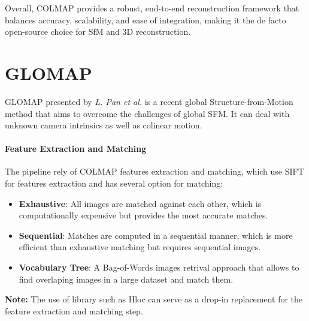 
Overall, COLMAP provides a robust, end-to-end reconstruction framework that balances accuracy, scalability, and ease of integration, making it the de facto open-source choice for SfM and 3D reconstruction.

\section{GLOMAP}\label{sec:glomap}
GLOMAP \cite{pan2024glomap} presented by \textit{L. Pan et al.} is a recent global Structure-from-Motion method that aims to overcome the challenges of global SFM. It can deal with unknown camera intrinsics as well as colinear motion.

\paragraph{Feature Extraction and Matching}
The pipeline rely of COLMAP features extraction and matching, which use SIFT \cite{Lowe2004DistinctiveIF} for features extraction and has several option for matching: 
\begin{itemize}
    \item \textbf{Exhaustive}: All images are matched against each other, which is computationally expensive but provides the most accurate matches.
    \item \textbf{Sequential}: Matches are computed in a sequential manner, which is more efficient than exhaustive matching but requires sequential images.
    \item \textbf{Vocabulary Tree}: A Bag-of-Words images retrival approach \cite{schoenberger2016vote} that allows to find overlaping images in a large dataset and match them.
\end{itemize}
\textbf{Note:} The use of library such as Hloc \cite{sarlin2019coarse} can serve as a drop-in replacement for the feature extraction and matching step.

